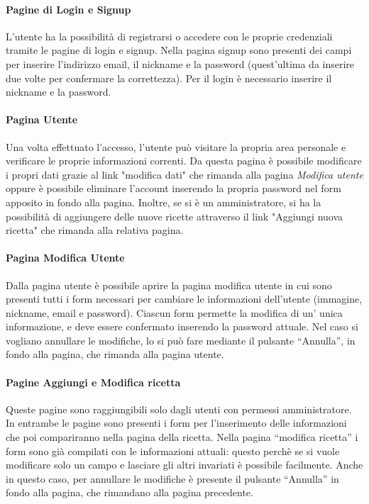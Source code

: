 \paragraph{Pagine di Login e Signup}
L'utente ha la possibilità di registrarsi o accedere con le proprie credenziali tramite le pagine di login e signup. Nella pagina signup sono presenti dei campi per inserire l'indirizzo email, il nickname e la password (quest'ultima da inserire due volte per confermare la correttezza). Per il login è necessario inserire il nickname e la password.

\paragraph{Pagina Utente}
Una volta effettuato l'accesso, l'utente può visitare la propria area personale e verificare le proprie informazioni correnti. Da questa pagina è possibile modificare i propri dati grazie al link "modifica dati" che rimanda alla pagina \textit{Modifica utente} oppure è possibile eliminare l'account inserendo la propria password nel form apposito in fondo alla pagina. Inoltre, se si è un amministratore, si ha la possibilità di aggiungere delle nuove ricette attraverso il link "Aggiungi nuova ricetta" che rimanda alla relativa pagina.

\paragraph{Pagina Modifica Utente}
Dalla pagina utente è possibile aprire la pagina modifica utente in cui sono presenti tutti i form necessari per cambiare le informazioni dell'utente (immagine, nickname, email e password). Ciascun form permette la modifica di un' unica informazione, e deve essere confermato inserendo la password attuale. Nel caso si vogliano annullare le modifiche, lo si può fare mediante il pulsante ``Annulla'', in fondo alla pagina, che rimanda alla pagina utente.

\paragraph{Pagine Aggiungi e Modifica ricetta}
Queste pagine sono raggiungibili solo dagli utenti con permessi amministratore. In entrambe le pagine sono presenti i form per l'inserimento delle informazioni che poi compariranno nella pagina della ricetta. Nella pagina ``modifica ricetta'' i form sono già compilati con le informazioni attuali: questo perchè se si vuole modificare solo un campo e lasciare gli altri invariati è possibile facilmente. Anche in questo caso, per annullare le modifiche è presente il pulsante ``Annulla'' in fondo alla pagina, che rimandano alla pagina precedente.

